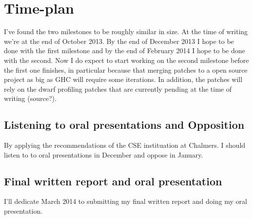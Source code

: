 \section{Time-plan}

I've found the two milestones to be roughly similar in size. At the time of
writing we're at the end of October 2013. By the end of December 2013 I hope to
be done with the first milestone and by the end of February 2014 I hope to be
done with the second. Now I do expect to start working on the second milestone
before the first one finishes, in particular because that merging patches to a
open source project as big as GHC will require some iterations. In addition, the
patches will rely on the dwarf profiling patches that are currently pending at
the time of writing (source?).

\subsection{Listening to oral presentations and Opposition}

By applying the recommendations of the CSE instituation at Chalmers. I should
listen to to oral presentations in December and oppose in January.

\subsection{Final written report and oral presentation}

I'll dedicate March 2014 to submitting my final written report and doing my oral
presentation.

